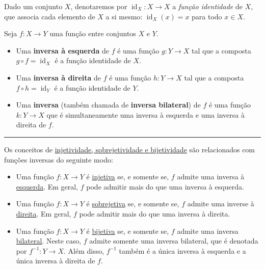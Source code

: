 Dado um conjunto $X$, denotaremos por $\operatorname{id}_X\colon X\to X$ a \textit{função identidade} de $X$, que associa cada elemento de $X$ a si mesmo: $\operatorname{id}_X(x)=x$ para todo $x\in X$.

\begin{definition}
	Seja $f\colon X\to Y$ uma função entre conjuntos $X$ e $Y$.
	\begin{itemize}
		\item Uma \textbf{inversa à esquerda} de $f$ é uma função $g\colon Y\to X$ tal que a composta $g\circ f=\operatorname{id}_X$ é a função identidade de $X$.
		
		\item Uma \textbf{inversa à direita} de $f$ é uma função $h\colon Y\to X$ tal que a composta $f\circ h=\operatorname{id}_Y$ é a função identidade de $Y$.
		
		\item Uma \textbf{inversa} (também chamada de \textbf{inversa bilateral}) de $f$ é uma função $k\colon Y\to X$ que é simultaneamente uma inversa à esquerda e uma inversa à direita de $f$.
	\end{itemize}
\end{definition}

\hrule

Os conceitos de \href{http://mtm.ufsc.br/~cordeiro/ensino/mtm3112.algebra.linear/12.trans.lin.inj.sobre/rev_inj_sobre_moodle.html}{injetividade, sobrejetividade e bijetividade} são relacionados com funções inversas do seguinte modo:
\begin{itemize}
	\item Uma função $f\colon X\to Y$ é \uline{injetiva} se, e somente se, $f$ admite uma inversa à \uline{esquerda}. Em geral, $f$ pode admitir mais do que uma inversa à esquerda.
	\item Uma função $f\colon X\to Y$ é \uline{sobrejetiva} se, e somente se, $f$ admite uma inverse à \uline{direita}. Em geral, $f$ pode admitir mais do que uma inversa à direita.
	\item Uma função $f\colon X\to Y$ é \uline{bijetiva} se, e somente se, $f$ admite uma inversa \uline{bilateral}. Neste caso, $f$ admite somente uma inversa bilateral, que é denotada por $f^{-1}\colon Y\to X$. Além disso, $f^{-1}$ também é a única inversa à esquerda e a única inversa à direita de $f$.
\end{itemize}